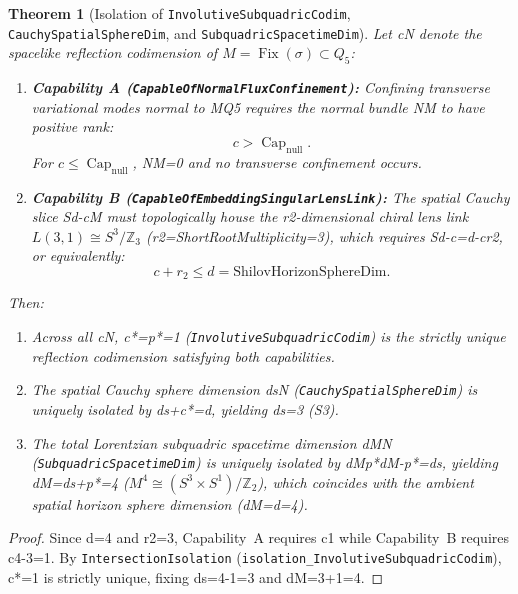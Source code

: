 \documentclass[11pt,reqno]{amsart}
\newtheorem{theorem}{Theorem}[section]
\theoremstyle{definition}
\theoremstyle{remark}
\newcommand{\CapNull}{\operatorname{Cap}_{\mathrm{null}}}
\newcommand{\Fix}{\operatorname{Fix}}
\begin{document}
\begin{theorem}[Isolation of \texttt{InvolutiveSubquadricCodim}, \texttt{CauchySpatialSphereDim}, and \texttt{SubquadricSpacetimeDim}]
\label{thm:subquadric_isolation}
Let cN denote the spacelike reflection codimension of $M = \Fix(\sigma) \subset Q_5$:
\begin{enumerate}[label=(\alph*)]
  \item \textbf{Capability A (\texttt{CapableOfNormalFluxConfinement}):} Confining transverse variational modes normal to MQ5 requires the normal bundle NM to have positive rank:
  \begin{equation}
    c > \CapNull.
  \end{equation}
  For $c \le \CapNull$, NM={0} and no transverse confinement occurs.
  \item \textbf{Capability B (\texttt{CapableOfEmbeddingSingularLensLink}):} The spatial Cauchy slice Sd-cM must topologically house the r2-dimensional chiral lens link $L(3,1) \cong S^3/\mathbb{Z}_3$ (r2=ShortRootMultiplicity=3), which requires Sd-c=d-cr2, or equivalently:
  \begin{equation}
    c + r_2 \le d = \mathrm{ShilovHorizonSphereDim}.
  \end{equation}
\end{enumerate}
Then:
\begin{enumerate}[label=(\roman*)]
  \item Across all cN, c*=p*=1 (\texttt{InvolutiveSubquadricCodim}) is the strictly unique reflection codimension satisfying both capabilities.
  \item The spatial Cauchy sphere dimension dsN (\texttt{CauchySpatialSphereDim}) is uniquely isolated by ds+c*=d, yielding ds=3 (S3).
  \item The total Lorentzian subquadric spacetime dimension dMN (\texttt{SubquadricSpacetimeDim}) is uniquely isolated by dMp*dM-p*=ds, yielding dM=ds+p*=4 ($M^4 \cong (S^3 \times S^1)/\mathbb{Z}_2$), which coincides with the ambient spatial horizon sphere dimension (dM=d=4).
\end{enumerate}
\end{theorem}
\begin{proof}
Since d=4 and r2=3, Capability~A requires c1 while Capability~B requires c4-3=1. By \texttt{IntersectionIsolation} (\texttt{isolation\_InvolutiveSubquadricCodim}), c*=1 is strictly unique, fixing ds=4-1=3 and dM=3+1=4.
\end{proof}

\end{document}
